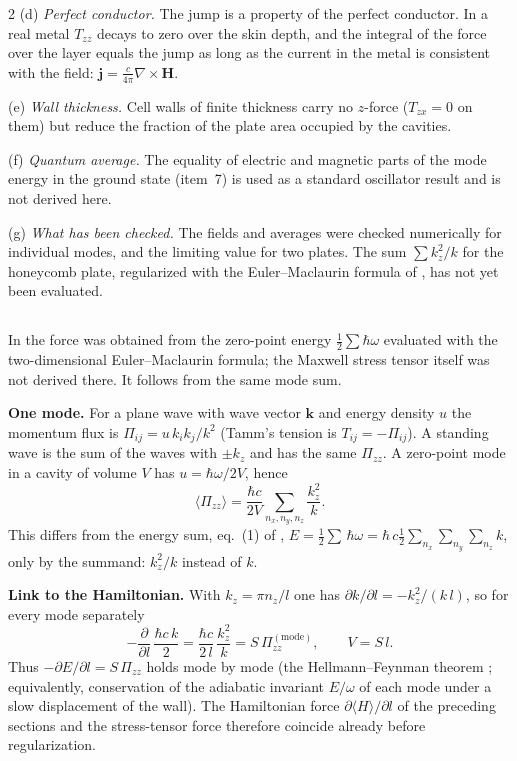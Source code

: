 \documentclass[twoside, 10pt]{article}
\def\myvspacebeforesubsection{-2.0mm}
\def\myvspaceaftersubsection{-2.5mm}
\begin{document}
\begin{multicols}{2}
(d) \textit{Perfect conductor.} The jump is a property of the perfect conductor. In a
real metal $T_{zz}$ decays to zero over the skin depth, and the integral of the force
over the layer equals the jump as long as the current in the metal is consistent
with the field: $\mathbf j=\frac c{4\pi}\nabla\times\mathbf H$.

(e) \textit{Wall thickness.} Cell walls of finite thickness carry no $z$-force
($T_{zx}=0$ on them) but reduce the fraction of the plate area occupied by the
cavities.

(f) \textit{Quantum average.} The equality of electric and magnetic parts of the mode
energy in the ground state (item~7) is used as a standard oscillator result and is
not derived here.

(g) \textit{What has been checked.} The fields and averages were checked numerically
for individual modes, and the limiting value for two plates. The sum $\sum k_z^2/k$
for the honeycomb plate, regularized with the Euler--Maclaurin formula of
\cite{Drozdov2024}, has not yet been evaluated.

\vspace{\myvspacebeforesubsection}
\subsection*{}
\vspace{\myvspaceaftersubsection}

In \cite{Drozdov2024} the force was obtained from the zero-point energy
$\frac12\sum\hbar\omega$ evaluated with the two-dimensional Euler--Maclaurin
formula; the Maxwell stress tensor itself was not derived there. It follows from
the same mode sum.

\textbf{One mode.} For a plane wave with wave vector $\mathbf{k}$ and energy
density $u$ the momentum flux is $\Pi_{ij}=u\,k_ik_j/k^2$ (Tamm's tension is
$T_{ij}=-\Pi_{ij}$). A standing wave is the sum of the waves with $\pm k_z$ and has
the same $\Pi_{zz}$. A zero-point mode in a cavity of volume $V$ has
$u=\hbar\omega/2V$, hence
\[
\langle\Pi_{zz}\rangle=\frac{\hbar c}{2V}\sum_{n_x,n_y,n_z}\frac{k_z^2}{k}.
\]
This differs from the energy sum, eq.~(1) of \cite{Drozdov2024},
$E = \frac{1}{2}\sum\,\hbar\omega = \hbar\,c\frac{1}{2}\sum\limits_{n_x}^{}\sum\limits_{n_y}^{}\sum\limits_{n_z}^{}k$,
only by the
summand: $k_z^2/k$ instead of $k$.

\textbf{Link to the Hamiltonian.} With $k_z=\pi n_z/l$ one has
$\partial k/\partial l=-k_z^2/(k\,l)$, so for every mode separately
\[
-\frac{\partial}{\partial l}\,\frac{\hbar c\,k}{2}=\frac{\hbar c}{2\,l}\,\frac{k_z^2}{k}
= S\,\Pi_{zz}^{\mathrm{(mode)}},\qquad V=S\,l .
\]
Thus $-\partial E/\partial l=S\,\Pi_{zz}$ holds mode by mode (the Hellmann--Feynman
theorem \cite{Feynman1939}; equivalently, conservation of the adiabatic invariant
$E/\omega$ of each mode under a slow displacement of the wall). The Hamiltonian
force $\partial\langle H\rangle/\partial l$ of the preceding sections and the
stress-tensor force therefore coincide already before regularization.


\end{multicols}
\end{document}
